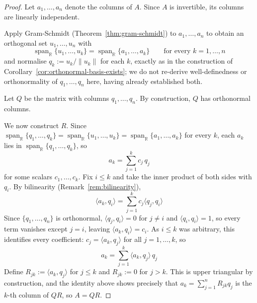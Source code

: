 		\begin{proof}
			Let $a_1,\dots, a_n$ denote the columns of $A$. Since $A$ is invertible, its columns are linearly independent.
			
			Apply Gram-Schmidt (Theorem~\ref{thm:gram-schmidt}) to $a_1,\dots,a_n$ to obtain an orthogonal set $u_1,\dots,u_n$ with
			\[
				\operatorname{span}_{\mathbb{R}}\{u_1,\dots,u_k\} = \operatorname{span}_{\mathbb{R}}\{a_1,\dots,a_k\} \qquad \text{for every } k=1, \dots, n
			\]
			and normalise $q_k := u_k/\|u_k\|$ for each $k$, exactly as in the construction of Corollary~\ref{cor:orthonormal-basis-exists}; we do not re-derive well-definedness or orthonormality of $q_1,\dots,q_n$ here, having already established both.
			
			Let $Q$ be the matrix with columns $q_1,\dots,q_n$. By construction, $Q$ has orthonormal columns.
			
			We now construct $R$. Since $\operatorname{span}_{\mathbb{R}}\{q_1,\dots,q_k\} = \operatorname{span}_{\mathbb{R}}\{u_1,\dots,u_k\} = \operatorname{span}_{\mathbb{R}}\{a_1,\dots,a_k\}$ for every $k$, each $a_k$ lies in $\operatorname{span}_{\mathbb{R}}\{q_1,\dots,q_k\}$, so
			\[
			a_k = \sum_{j=1}^{k} c_j\, q_j
			\]
			for some scalars $c_1,\dots,c_k$. Fix $i \le k$ and take the inner product of both sides with $q_i$. By bilinearity (Remark~\ref{rem:bilinearity}),
			\[
				\langle a_k, q_i \rangle = \sum_{j=1}^{k} c_j \langle q_j, q_i \rangle
			\]
			Since $\{q_1,\dots,q_n\}$ is orthonormal, $\langle q_j,q_i\rangle = 0$ for $j\neq i$ and $\langle q_i,q_i\rangle = 1$, so every term vanishes except $j=i$, leaving $\langle a_k, q_i\rangle = c_i$. As $i \le k$ was arbitrary, this identifies every coefficient: $c_j = \langle a_k, q_j\rangle$ for all $j=1,\dots,k$, so
			\[
				a_k = \sum_{j=1}^{k} \langle a_k, q_j \rangle\, q_j
			\]
			Define $R_{jk} := \langle a_k, q_j \rangle$ for $j \le k$ and $R_{jk} := 0$ for $j > k$. This is upper triangular by construction, and the identity above shows precisely that $a_k = \sum_{j=1}^n R_{jk} q_j$ is the $k$-th column of $QR$, so $A = QR$.
			

\end{proof}
